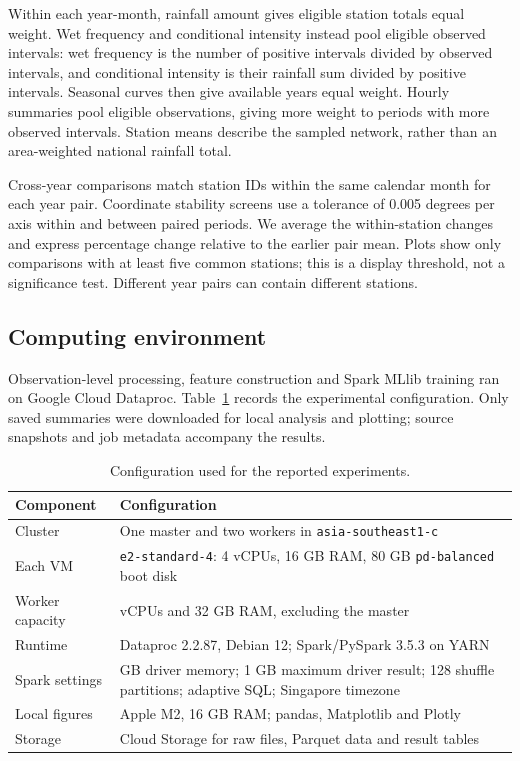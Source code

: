 Within each year-month, rainfall amount gives eligible station totals equal weight. Wet frequency and conditional intensity instead pool eligible observed intervals: wet frequency is the number of positive intervals divided by observed intervals, and conditional intensity is their rainfall sum divided by positive intervals. Seasonal curves then give available years equal weight. Hourly summaries pool eligible observations, giving more weight to periods with more observed intervals. Station means describe the sampled network, rather than an area-weighted national rainfall total.

Cross-year comparisons match station IDs within the same calendar month for each year pair. Coordinate stability screens use a tolerance of 0.005 degrees per axis within and between paired periods. We average the within-station changes and express percentage change relative to the earlier pair mean. Plots show only comparisons with at least five common stations; this is a display threshold, not a significance test. Different year pairs can contain different stations.

\subsection{Computing environment}
Observation-level processing, feature construction and Spark MLlib training ran on Google Cloud Dataproc. Table~\ref{tab:environment} records the experimental configuration. Only saved summaries were downloaded for local analysis and plotting; source snapshots and job metadata accompany the results.

\begin{table}[htbp]\small\centering
\begin{tabularx}{\linewidth}{>{\raggedright\arraybackslash}p{.22\linewidth}>{\raggedright\arraybackslash}X}
\toprule Component & Configuration\\\midrule
Cluster & One master and two workers in \texttt{asia-southeast1-c}\\
Each VM & \texttt{e2-standard-4}: 4 vCPUs, 16 GB RAM, 80 GB \texttt{pd-balanced} boot disk\\
Worker capacity & 8 vCPUs and 32 GB RAM, excluding the master\\
Runtime & Dataproc 2.2.87, Debian 12; Spark/PySpark 3.5.3 on YARN\\
Spark settings & 6 GB driver memory; 1 GB maximum driver result; 128 shuffle partitions; adaptive SQL; Singapore timezone\\
Local figures & Apple M2, 16 GB RAM; pandas, Matplotlib and Plotly\\
Storage & Cloud Storage for raw files, Parquet data and result tables\\
\bottomrule
\end{tabularx}
\caption{Configuration used for the reported experiments.}
\label{tab:environment}
\end{table}
